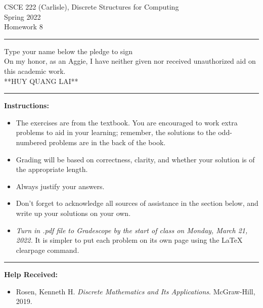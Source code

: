 \documentclass[12pt]{article}  %
\begin{document}
\begin{center}         %
{\large                %
CSCE 222 (Carlisle), Discrete Structures for Computing \\  %
Spring 2022 \\
Homework 8}
\end{center}
\rule{6in}{.1pt}       %
\begin{center}
{\large
Type your name below the pledge to sign\\
On my honor, as an Aggie, I have neither given nor received unauthorized aid on this academic work.\\
**HUY QUANG LAI**}
\end{center}


\rule{6in}{.1pt}       %
                    
\noindent              %
{\bf Instructions:}    %

\begin{itemize}        %
\item The exercises are from the textbook.  You are encouraged to work
      extra problems to aid in your learning; remember, the solutions to 
      the odd-numbered problems are in the back of the book.
\item Grading will be based on correctness, clarity, and whether your
      solution is of the appropriate length.
\item Always justify your answers.
\item Don't forget to acknowledge all sources of assistance in the section below, and write up your solutions on your own.
\item {\em Turn in .pdf file to Gradescope by the start of class on Monday, March 21, 2022.}  It is simpler to put each problem on its own page using the LaTeX clearpage command.
\end{itemize}


\rule{6in}{.1pt}       %

{\bf Help Received:}    %
\begin{itemize}
\item Rosen, Kenneth H. \textit{Discrete Mathematics and Its Applications}. McGraw-Hill, 2019.
\end{itemize}
\end{document}
